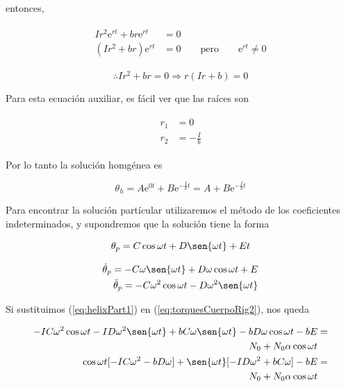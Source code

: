 \documentclass[a4paper,10pt]{article}
\numberwithin{equation}{section}
\newcommand{\euler}{\mathrm{e}}
\begin{document}
entonces,

\begin{align*}
 \begin{split}
%  
  Ir^2\euler^{rt} + br\euler^{rt} &= 0 \\
  (Ir^2+br)\euler^{rt} &= 0 \qquad \text{pero} \qquad \euler^{rt} \neq 0
%
 \end{split}
\end{align*}

$$
\therefore Ir^2 + br = 0 \Rightarrow r(Ir + b) = 0
$$

Para esta ecuación auxiliar, es fácil ver que las raíces son

\begin{align*}
 \begin{split}
  r_1 &= 0 \\
  r_2 &= - \frac{I}{b}
  \label{eq:raicesHelixHomog}
 \end{split}
\end{align*}

Por lo tanto la solución homgénea es

\begin{equation}
 \theta_h = A \euler^{0t} + B \euler^{-\frac{I}{b}t} = A + B \euler^{-\frac{I}{b}t}
 \label{eq:solucHelixHomog}
\end{equation}

Para encontrar la solución partícular utilizaremos el método de los coeficientes
indeterminados, y supondremos que la solución tiene la forma

$$
\theta_p = C \cos{\omega t} + D \sen{\omega t} + E t
$$

\begin{align}
 \begin{split}
  \dot{\theta}_p = - C \omega \sen{\omega t} + D \omega \cos{\omega t} + E \\
  \ddot{\theta}_p = - C \omega^2 \cos{\omega t} - D \omega^2 \sen{\omega t}
  \label{eq:helixPart1}
 \end{split}
\end{align}

Si sustituimos (\ref{eq:helixPart1}) en (\ref{eq:torquesCuerpoRig2}), nos queda

\begin{align*}
 \begin{split}
 -IC\omega^2 \cos{\omega t} - ID\omega^2 \sen{\omega t} + bC\omega \sen{\omega t} 
 -bD\omega \cos{\omega t} - bE &= \\ N_0 + N_0\alpha \cos{\omega t} \\
 \cos{\omega t}[-IC\omega^2 - bD\omega] + \sen{\omega t}[-ID\omega^2+bC\omega]
 -bE  &= \\ N_0 + N_0\alpha \cos{\omega t}
 \end{split}
\end{align*}
\end{document}
